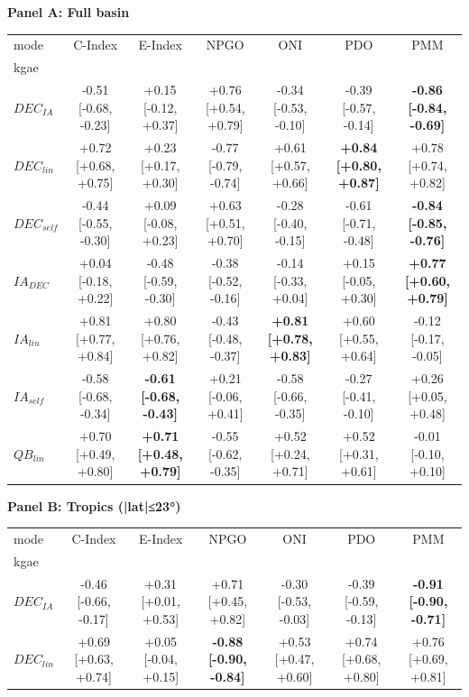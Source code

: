 \begin{table}[t]
\centering
\small
\setlength{\tabcolsep}{4pt}
\renewcommand{\arraystretch}{1.15}
\textbf{Panel A: Full basin}\\
\begin{tabular}{lcccccc}
\toprule
mode & C-Index & E-Index & NPGO & ONI & PDO & PMM \\
kgae &  &  &  &  &  &  \\
\midrule
$DEC_{IA}$ & -0.51 [-0.68, -0.23] & +0.15 [-0.12, +0.37] & +0.76 [+0.54, +0.79] & -0.34 [-0.53, -0.10] & -0.39 [-0.57, -0.14] & \textbf{-0.86 [-0.84, -0.69]} \\
$DEC_{lin}$ & +0.72 [+0.68, +0.75] & +0.23 [+0.17, +0.30] & -0.77 [-0.79, -0.74] & +0.61 [+0.57, +0.66] & \textbf{+0.84 [+0.80, +0.87]} & +0.78 [+0.74, +0.82] \\
$DEC_{self}$ & -0.44 [-0.55, -0.30] & +0.09 [-0.08, +0.23] & +0.63 [+0.51, +0.70] & -0.28 [-0.40, -0.15] & -0.61 [-0.71, -0.48] & \textbf{-0.84 [-0.85, -0.76]} \\
$IA_{DEC}$ & +0.04 [-0.18, +0.22] & -0.48 [-0.59, -0.30] & -0.38 [-0.52, -0.16] & -0.14 [-0.33, +0.04] & +0.15 [-0.05, +0.30] & \textbf{+0.77 [+0.60, +0.79]} \\
$IA_{lin}$ & +0.81 [+0.77, +0.84] & +0.80 [+0.76, +0.82] & -0.43 [-0.48, -0.37] & \textbf{+0.81 [+0.78, +0.83]} & +0.60 [+0.55, +0.64] & -0.12 [-0.17, -0.05] \\
$IA_{self}$ & -0.58 [-0.68, -0.34] & \textbf{-0.61 [-0.68, -0.43]} & +0.21 [-0.06, +0.41] & -0.58 [-0.66, -0.35] & -0.27 [-0.41, -0.10] & +0.26 [+0.05, +0.48] \\
$QB_{lin}$ & +0.70 [+0.49, +0.80] & \textbf{+0.71 [+0.48, +0.79]} & -0.55 [-0.62, -0.35] & +0.52 [+0.24, +0.71] & +0.52 [+0.31, +0.61] & -0.01 [-0.10, +0.10] \\
\bottomrule
\end{tabular}
\vspace{0.6em}
\textbf{Panel B: Tropics (|lat|≤23°)}\\
\begin{tabular}{lcccccc}
\toprule
mode & C-Index & E-Index & NPGO & ONI & PDO & PMM \\
kgae &  &  &  &  &  &  \\
\midrule
$DEC_{IA}$ & -0.46 [-0.66, -0.17] & +0.31 [+0.01, +0.53] & +0.71 [+0.45, +0.82] & -0.30 [-0.53, -0.03] & -0.39 [-0.59, -0.13] & \textbf{-0.91 [-0.90, -0.71]} \\
$DEC_{lin}$ & +0.69 [+0.63, +0.74] & +0.05 [-0.04, +0.15] & \textbf{-0.88 [-0.90, -0.84]} & +0.53 [+0.47, +0.60] & +0.74 [+0.68, +0.80] & +0.76 [+0.69, +0.81] \\

\end{tabular}
\end{table}
